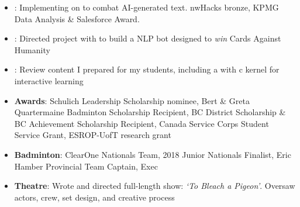 \documentclass[10pt,a4paper,ragged2e,withhyper]{altacv}
\begin{document}






\begin{itemize}
  \item \textbf{}: Implementing  on  to combat AI-generated text. nwHacks bronze, KPMG Data Analysis \& Salesforce Award.
  \item \textbf{}: Directed project with  to build a NLP bot designed to \textit{win} Cards Against Humanity
  \item \textbf{}: Review content I prepared for my students, including a  with c kernel for interactive learning
  \item \textbf{Awards}: Schulich Leadership Scholarship nominee, Bert \& Greta Quartermaine Badminton Scholarship Recipient, BC District Scholarship \& BC Achievement Scholarship Recipient, Canada Service Corps Student Service Grant, ESROP-UofT research grant
  \item \textbf{Badminton}: ClearOne Nationals Team, 2018 Junior Nationals Finalist, Eric Hamber Provincial Team Captain,  Exec
  \item \textbf{Theatre}: Wrote and directed full-length show: \textit{`To Bleach a Pigeon'}. Oversaw actors, crew, set design, and creative process
\end{itemize}










\end{document}
